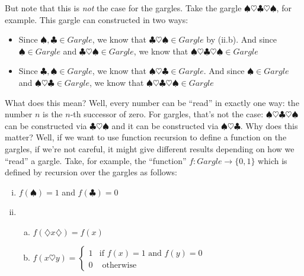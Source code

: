 \begin{enumerate}[{\thesection}.1]
		
		But note that this is \emph{not} the case for the gargles. Take the gargle $\spadesuit\heartsuit\clubsuit\heartsuit\spadesuit$, for example. This gargle can constructed in two ways: 
		\begin{itemize}
		
			\item Since $\spadesuit,\clubsuit\in Gargle$, we know that $\clubsuit\heartsuit\spadesuit\in Gargle$ by (ii.b). And since $\spadesuit\in Gargle$ and $\clubsuit\heartsuit\spadesuit\in Gargle$, we know that $\spadesuit\heartsuit\clubsuit\heartsuit\spadesuit\in Gargle$
		
			\item Since $\clubsuit,\spadesuit\in Gargle$, we know that $\spadesuit\heartsuit\clubsuit\in Gargle$. And since $\spadesuit\in Gargle$ and $\spadesuit\heartsuit\clubsuit\in Gargle$, we know that $\spadesuit\heartsuit\clubsuit\heartsuit\spadesuit\in Gargle$
		
		\end{itemize}
		
		
		What does this mean? Well, every number can be ``read'' in exactly one way: the number $n$ is the $n$-th successor of zero. For gargles, that's not the case: $\spadesuit\heartsuit\clubsuit\heartsuit\spadesuit$ can be constructed via $\clubsuit\heartsuit\spadesuit$ and it can be constructed via $\spadesuit\heartsuit\clubsuit$. Why does this matter? Well, if we want to use function recursion to define a function on the gargles, if we're not careful, it might give different results depending on how we ``read'' a gargle. Take, for example, the ``function'' $f:Gargle\to\{0,1\}$ which is defined by recursion over the gargles as follows:
		\begin{enumerate}[(i)]
		
			\item $f(\spadesuit)=1$ and $f(\clubsuit)=0$
			
			\item \begin{enumerate}[(a)]
			
				\item $f(\diamondsuit x\diamondsuit)=f(x)$
				
				\item $f(x\heartsuit y)=\begin{cases}
			1 & \text{if }f(x)=1\text{ and }f(y)=0\\
			0 &\text{ otherwise}
			\end{cases}$
			
			\end{enumerate}
		

\end{enumerate}
\end{enumerate}
